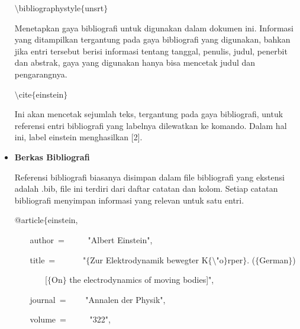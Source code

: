 \begin{itemize}
$\setminus$bibliographystyle$ \{ $unsrt$ \} $\par

Menetapkan gaya bibliografi untuk digunakan dalam dokumen ini. Informasi yang ditampilkan tergantung pada gaya bibliografi yang digunakan, bahkan jika entri tersebut berisi informasi tentang tanggal, penulis, judul, penerbit dan abstrak, gaya yang digunakan hanya bisa mencetak judul dan pengarangnya.\par

$\setminus$cite$ \{ $einstein$ \} $\par

Ini akan mencetak sejumlah teks, tergantung pada gaya bibliografi, untuk referensi entri bibliografi yang labelnya dilewatkan ke komando. Dalam hal ini, label einstein menghasilkan [2].\par

\vspace{12pt}
	\item {\fontsize{14pt}{14pt}\selectfont \textbf{Berkas Bibliografi}}\par

Referensi bibliografi biasanya disimpan dalam file bibliografi yang ekstensi adalah .bib, file ini terdiri dari daftar catatan dan kolom. Setiap catatan bibliografi menyimpan informasi yang relevan untuk satu entri.\par

\hspace*{0.5in}\hspace*{0.5in}@article$ \{ $einstein,\par

~~~ \hspace*{0.5in}author~=~~~~~  "Albert Einstein",\par

~~~ \hspace*{0.5in}title~=~~~~~~  "$ \{ $Zur Elektrodynamik bewegter K$ \{ $$\setminus$"o$ \} $rper$ \} $. ($ \{ $German$ \} $)\par

~~~ \hspace*{0.5in}~~~ [$ \{ $On$ \} $ the electrodynamics of moving bodies]",\par

~~~ \hspace*{0.5in}journal~=~~~~  "Annalen der Physik",\par

~~~ \hspace*{0.5in}volume~=~~~~~  "322",\par


\end{itemize}
